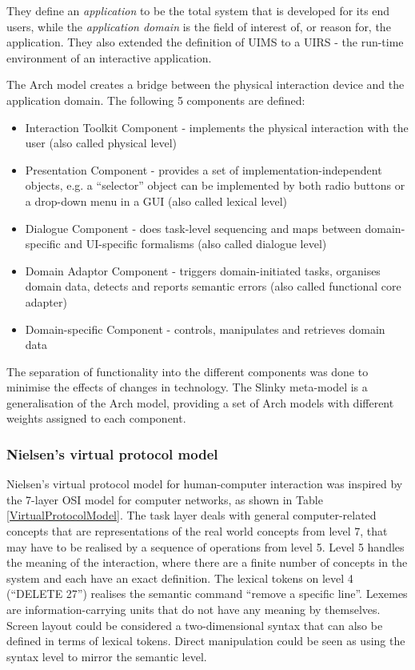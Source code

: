 	 They define an \emph{application} to be the total system that is developed for its end users, while the \emph{application domain} is the field of interest of, or reason for, the application. They also extended the definition of \ac{UIMS} to a  \ac{UIRS} - the run-time environment of an interactive application.
	
	The Arch model creates a bridge between the physical interaction device and the application domain. The following 5 components are defined:
	
	\begin{itemize}
		\item Interaction Toolkit Component - implements the physical interaction with the user (also called physical level)
		\item Presentation Component - provides a set of implementation-independent objects, e.g. a ``selector'' object can be implemented by both radio buttons or a drop-down menu in a GUI (also called lexical level)
		\item Dialogue Component - does task-level sequencing and maps between domain-specific and UI-specific formalisms (also called dialogue level)
		\item Domain Adaptor Component - triggers domain-initiated tasks, organises domain data, detects and reports semantic errors (also called functional core adapter)
		\item Domain-specific Component - controls, manipulates and retrieves domain data
	\end{itemize}

The separation of functionality into the different components was done to minimise the effects of changes in technology. The Slinky meta-model is a generalisation of the Arch model, providing a set of Arch models with different weights assigned to each component.

\subsubsection{Nielsen's virtual protocol model}
\label{nielsenVPM}
Nielsen's virtual protocol model for human-computer interaction \cite{Nielsen1986} was inspired by the 7-layer OSI model for computer networks, as shown in Table \ref{VirtualProtocolModel}. The task layer deals with general computer-related concepts that are representations of the real world concepts from level 7, that may have to be realised by a sequence of operations from level 5. Level 5 handles the meaning of the interaction, where there are a finite number of concepts in the system and each have an exact definition. The lexical tokens on level 4 (``DELETE 27'') realises the semantic command ``remove a specific line''. Lexemes are information-carrying units that do not have any meaning by themselves. Screen layout could be considered a two-dimensional syntax that can also be defined in terms of lexical tokens. Direct manipulation \cite{Shneiderman1997} could be seen as using the syntax level to mirror the semantic level.

